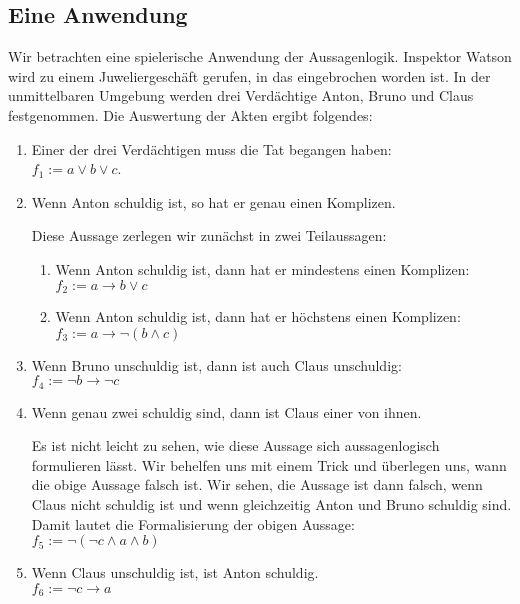 \subsection{Eine Anwendung}
Wir betrachten eine spielerische Anwendung der Aussagenlogik.  Inspektor Watson wird zu
einem Juweliergeschäft gerufen, in das eingebrochen worden ist.
In der unmittelbaren Umgebung werden drei Verdächtige Anton, Bruno und Claus festgenommen.
Die Auswertung der Akten ergibt folgendes:
\begin{enumerate}
\item Einer der drei Verdächtigen muss die Tat begangen haben: \\[0.2cm]
      \hspace*{1.3cm} 
      $f_1 := a \vee b \vee c$.
\item Wenn Anton schuldig ist, so hat er genau einen Komplizen. 

      Diese Aussage zerlegen wir zunächst in zwei Teilaussagen:
      \begin{enumerate}
      \item Wenn Anton schuldig ist, dann hat er mindestens einen Komplizen: \\[0.2cm]
            \hspace*{1.3cm} $f_2 := a \rightarrow b \vee c$ 
      \item Wenn Anton schuldig ist, dann hat er höchstens einen Komplizen: \\[0.2cm]
           \hspace*{1.3cm} $f_3 := a \rightarrow \neg (b \wedge c)$
      \end{enumerate}
\item Wenn Bruno unschuldig ist, dann ist auch Claus unschuldig: \\[0.2cm]
      \hspace*{1.3cm} $f_4 :=  \neg b \rightarrow \neg c$ 
\item Wenn genau zwei schuldig sind, dann ist Claus einer von ihnen.

      Es ist nicht leicht zu sehen, wie diese Aussage sich aussagenlogisch
      formulieren lässt.  Wir behelfen uns mit einem Trick und überlegen uns, wann die
      obige Aussage falsch ist.  Wir sehen, die Aussage ist dann falsch,
      wenn Claus nicht schuldig ist und wenn gleichzeitig Anton und Bruno schuldig sind.
      Damit lautet die Formalisierung der obigen Aussage: \\[0.2cm]
      \hspace*{1.3cm} $f_5 := \neg ( \neg c  \wedge a \wedge b )$ 
\item Wenn Claus unschuldig ist, ist Anton schuldig. \\[0.2cm]
      \hspace*{1.3cm} $f_6 := \neg c \rightarrow a$
\end{enumerate}
